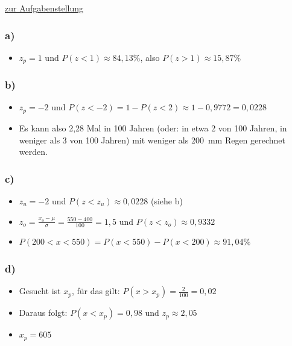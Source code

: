 \documentclass[
  11pt,
  ngerman,
  a4paper,
]{report}
\providecommand{\tightlist}{%
  \setlength{\itemsep}{0pt}\setlength{\parskip}{0pt}}
\begin{document}
\protect\hyperlink{aufgabe-3-6}{zur Aufgabenstellung}

\hypertarget{a-13}{%
\subsubsection{a)}\label{a-13}}

\begin{itemize}
\tightlist
\item
  \(z_p=1\) und \(P(z<1)\approx84,13\%\), also \(P(z>1)\approx15,87\%\)
\end{itemize}

\hypertarget{b-13}{%
\subsubsection{b)}\label{b-13}}

\begin{itemize}
\tightlist
\item
  \(z_p=-2\) und \(P(z<-2) = 1-P(z<2) \approx 1-0,9772 = 0,0228\)
\item
  Es kann also 2,28 Mal in 100 Jahren (oder: in etwa 2 von 100 Jahren, in weniger als 3 von 100 Jahren) mit weniger als 200~mm Regen gerechnet werden.
\end{itemize}

\hypertarget{c-11}{%
\subsubsection{c)}\label{c-11}}

\begin{itemize}
\tightlist
\item
  \(z_u=-2\) und \(P(z<z_u)\approx 0,0228\) (siehe b)
\item
  \(z_o=\frac{x_o- \mu}{\sigma}=\frac{550-400}{100}=1,5\) und \(P(z<z_o) \approx 0,9332\)
\item
  \(P(200 < x < 550) = P(x < 550) - P(x<200) \approx 91,04\%\)
\end{itemize}

\hypertarget{d-5}{%
\subsubsection{d)}\label{d-5}}

\begin{itemize}
\tightlist
\item
  Gesucht ist \(x_p\), für das gilt: \(P(x>x_p) = \frac{2}{100}=0,02\)
\item
  Daraus folgt: \(P(x<x_p) = 0,98\) und \(z_p\approx2,05\)
\item
  \(x_p = 605\)
\end{itemize}
\end{document}
